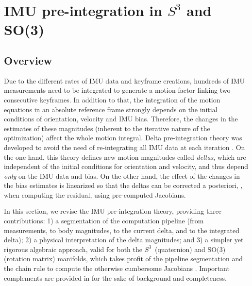 




\section{IMU pre-integration in $S^3$ and SO(3)}
\label{sec:imu}

\subsection{Overview}

Due to the different rates of IMU data and keyframe creations, hundreds of IMU measurements need to be integrated to generate a motion factor linking two consecutive keyframes. 
In addition to that, the integration of the motion equations in an absolute reference frame strongly depends on the initial conditions of orientation, velocity and IMU bias.
Therefore, the changes in the estimates of these magnitudes (inherent to the iterative nature of the optimization) affect the whole motion integral. 
Delta pre-integration theory was developed to avoid the need of re-integrating all IMU data at each iteration \cite{LUPTON-09,forster2015imu}. 
On the one hand, this theory defines new motion magnitudes called \emph{deltas}, which are independent of the initial conditions for orientation and velocity, and thus depend \emph{only} on the IMU data and bias. 
On the other hand, the effect of the changes in the bias estimates is linearized so that the deltas can be corrected a posteriori, 
\ie, when computing the residual, 
using pre-computed Jacobians. 

In this section, we revise the IMU pre-integration theory, providing three contributions: 
1) a segmentation of the computation pipeline (from measurements, to body magnitudes, to the current delta, and to the integrated delta); 
2) a physical interpretation of the delta magnitudes; 
and 
3) a simpler yet rigorous algebraic approach, valid for both the $S^3$~(quaternion) and SO(3) (rotation matrix) manifolds, which takes profit of the pipeline segmentation and the chain rule to compute the otherwise cumbersome Jacobians \cite{forster2015imu}. 
Important complements are provided in  for the sake of background and completeness.


